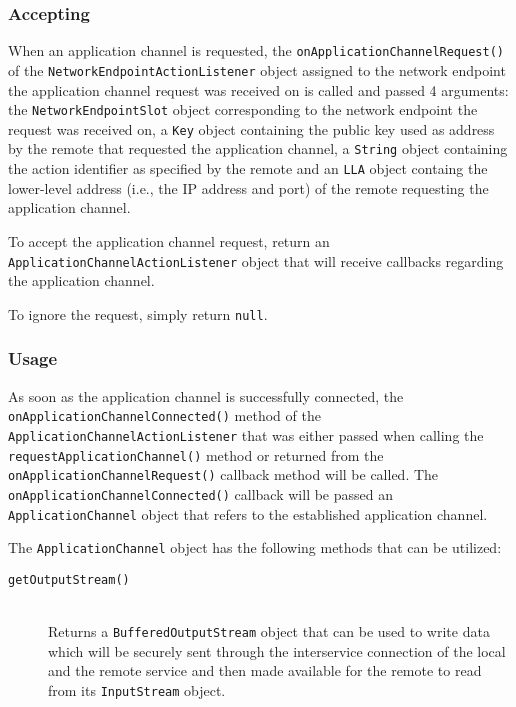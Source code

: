 \documentclass[a4paper,twoside,DIV=12,BCOR=1cm]{scrartcl}
\newcommand{\code}[1]{\texttt{#1}}
\begin{document}
\begin{multicols}{2}
\subsubsection*{Accepting}
When an application channel is requested, the
\code{on\-Application\-Channel\-Request()} of the \code{Network\-Endpoint\-Action\-Listener}
object assigned to the network endpoint the application channel request was
received on is called and passed 4 arguments: the \code{Network\-Endpoint\-Slot}
object corresponding to the network endpoint the request was received on, a
\code{Key} object containing the public key used as address by the remote that
requested the application channel, a \code{String} object containing the action
identifier as specified by the remote and an \code{LLA} object containg the
lower-level address (i.e., the IP address and port) of the remote requesting the
application channel.

To accept the application channel request, return an
\code{Application\-Channel\-Action\-Listener} object that will receive callbacks
regarding the application channel.

To ignore the request, simply return \code{null}.

\subsubsection*{Usage}
As soon as the application channel is successfully connected, the
\code{on\-Application\-Channel\-Connected()} method of the
\code{Application\-Channel\-Action\-Listener} that was either passed when calling the
\code{request\-Application\-Channel()} method or returned from the
\code{on\-Application\-Channel\-Request()} callback method will be called. The
\code{on\-Application\-Channel\-Connected()} callback will be passed an
\code{Application\-Channel} object that refers to the established application
channel.

The \code{Application\-Channel} object has the following methods that can be
utilized:

\begin{description}

    \item[{\code{getOutputStream()}}] \hfill \\
        Returns a \code{Buffered\-Output\-Stream} object
        that can be used to write data which will be securely sent through the
        interservice connection of the local and the remote service and then
        made available for the remote to read from its \code{Input\-Stream}
        object.


\end{description}
\end{multicols}
\end{document}
